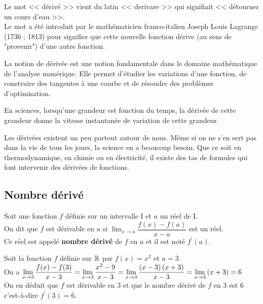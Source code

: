 


  
  Le mot << dérivé >> vient du latin << derivare >> qui signifiait << détourner un
cours d'eau >>.\\
Le mot a été introduit par le mathématicien franco-italien Joseph Louis
Lagrange (1736 ; 1813) pour signifier que cette nouvelle fonction dérive
(au sens de "provenir") d'une autre fonction.

La notion de dérivée est une notion fondamentale dans le domaine mathématique de l'analyse numérique. Elle permet d'étudier les variations d'une fonction, de construire des tangentes à une courbe et de résoudre des problèmes d'optimisation.

En sciences, lorsqu'une grandeur est fonction du temps, la dérivée de cette grandeur donne la vitesse instantanée de variation de cette grandeur.

Les dérivées existent un peu partout autour de nous. Même si on ne s'en sert pas dans la vie de tous les jours, la science en a beaucoup besoin. Que ce soit en thermodynamique, en chimie ou en électricité, il existe des tas de formules qui font intervenir des dérivées de fonctions. 


\subsection{Nombre dérivé}


\begin{definition}
 Soit   une fonction  $ f$  définie sur un intervalle I  et $ a $  un réel de I.\\
 On dit que $ f $ est dérivable en $ a $ si  $\displaystyle \lim_{x\to a}{\dfrac{f(x)-f(a)}{x-a} }$   est un réel.\\ Ce réel est appelé \textbf{nombre dérivé} de $ f $  en $ a $ et il est noté\; $ f^{\prime}(a) $.
\end{definition}

\begin{example}

 Soit la fonction $ f $ définie sur $ \mathbb{R} $  par \;  $ f(x)=x^{2} $ et  $ a=3 $.\\
 
 On a \; $ \displaystyle\lim_{x\to 3}{\dfrac{f(x)-f(3)}{x-3} }=\displaystyle \lim_{x\to 3}{\dfrac{x^{2}-9}{x-3} }=\lim_{x\to 3}{\dfrac{\left(x-3\right)\left(x+3\right)}{x-3} }=\lim_{x\to 3}{\left(x+3\right)=6 }$ \\
 
 On en déduit que   $ f $ est dérivable en 3 et que le nombre dérivé de $ f $  en 3 est 6 c'est-à-dire \;  $ f^{\prime}(3)=6$.
\end{example}


